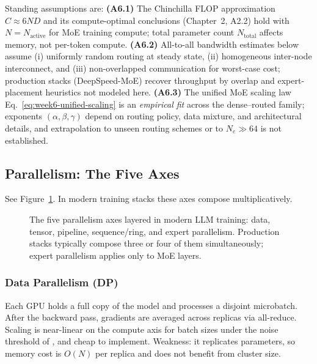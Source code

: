\begin{notationbox}
Standing assumptions are:
\textbf{(A6.1)} The Chinchilla FLOP approximation $C \approx 6 N D$
and its compute-optimal conclusions (Chapter~2, A2.2) hold with
$N = N_{\mathrm{active}}$ for MoE training compute; total parameter
count $N_{\mathrm{total}}$ affects memory, not per-token compute.
\textbf{(A6.2)} All-to-all bandwidth estimates below assume (i)
uniformly random routing at steady state, (ii) homogeneous
inter-node interconnect, and (iii) non-overlapped communication for
worst-case cost; production stacks (DeepSpeed-MoE) recover
throughput by overlap and expert-placement heuristics not modeled
here.
\textbf{(A6.3)} The unified MoE scaling law
Eq.~\eqref{eq:week6-unified-scaling} is an \emph{empirical fit}
across the dense--routed family; exponents
$(\alpha, \beta, \gamma)$ depend on routing policy, data mixture,
and architectural details, and extrapolation to unseen routing
schemes or to $N_e \gg 64$ is not established.
\end{notationbox}

\subsection{Parallelism: The Five Axes}

See Figure~\ref{fig:week6-parallelism-axes}. In modern training
stacks these axes compose multiplicatively.

\begin{figure}[h]
\centering

\caption{The five parallelism axes layered in modern LLM training:
  data, tensor, pipeline, sequence/ring, and expert parallelism.
  Production stacks typically compose three or four of them
  simultaneously; expert parallelism applies only to MoE layers.}
\label{fig:week6-parallelism-axes}
\end{figure}

\subsubsection{Data Parallelism (DP)}

Each GPU holds a full copy of the model and processes a disjoint
microbatch. After the backward pass, gradients are averaged across
replicas via all-reduce. Scaling is near-linear on the compute axis
for batch sizes under the noise threshold of
\citet{mccandlish2018empirical}, and cheap to implement. Weakness: it
replicates parameters, so memory cost is $O(N)$ per replica and does
not benefit from cluster size.

